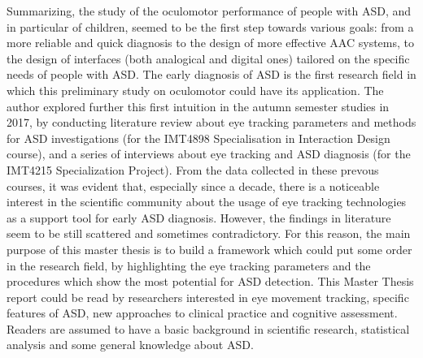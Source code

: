 Summarizing, the study of the oculomotor performance of people with ASD, and in particular of children, seemed to be the first step towards various goals: from a more reliable and quick diagnosis to the design of more effective AAC systems, to the design of interfaces (both analogical and digital ones) tailored on the specific needs of people with ASD.
The early diagnosis of ASD is the first research field in which this preliminary study on oculomotor could have its application.
The author explored further this first intuition in the autumn semester studies in 2017, by conducting literature review about eye tracking parameters and methods for ASD investigations (for the IMT4898 Specialisation in Interaction Design course), and a series of interviews 
about eye tracking and ASD diagnosis (for the IMT4215 Specialization Project). From the data collected in these prevous courses, it was evident that, especially since a decade, there is a noticeable interest in the scientific community about the usage of eye tracking technologies as a support tool for early ASD diagnosis. However, the findings in literature seem to be still scattered and sometimes contradictory. For this reason, the main purpose of this master thesis is to build a framework which could put some order in the research field, by highlighting the eye tracking parameters and the procedures which show the most potential for ASD detection.
This Master Thesis report could be read by researchers interested in eye movement tracking, specific features of ASD, new approaches to clinical practice and cognitive assessment.
Readers are assumed to have a basic background in scientific research, statistical analysis and some general knowledge about ASD.\\[2cm]

\thesisdate \\[1pc]
\\[1pc]
